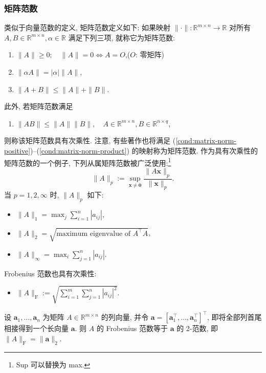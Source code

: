 \subsubsection{{矩阵范数}}\label{subsec:matrix-norm}
{类似于向量范数的定义, 矩阵范数定义如下: 如果映射 $\|\cdot\|:\mathbb R^{m\times n}\to\mathbb R$ 对所有 $A,B\in\mathbb R^{m\times n},\alpha\in\mathbb R$ 满足下列三项, 就称它为矩阵范数:}
\begin{enumerate}[label=(Nm\arabic*),ref=Nm\arabic*]
\item\label{cond:matrix-norm-positive} $\|A\|\ge0;\quad\|A\|=0\iff A=O$,\quad ($O$: {零矩阵})
\item\label{cond:matrix-norm-homogeneous} $\|\alpha A\|=|\alpha|\|A\|$,
\item\label{cond:matrix-norm-triangle} $\|A+B\|\le\|A\|+\|B\|$.
\end{enumerate}
{此外, 若矩阵范数满足}
\begin{enumerate}[label=(Nm\arabic*),ref=Nm\arabic*,start=4]
\item\label{cond:matrix-norm-product} $\|AB\|\le\|A\|\|B\|,\quad A\in\mathbb R^{m\times n},B\in\mathbb R^{n\times q}$,
\end{enumerate}
{则称该矩阵范数具有次乘性. 注意, 有些著作也将满足 (\ref{cond:matrix-norm-positive})--(\ref{cond:matrix-norm-product}) 的映射称为矩阵范数. 作为具有次乘性的矩阵范数的一个例子, 下列从属矩阵范数被广泛使用:\footnote{Sup 可以替换为 max.}}
\begin{equation}\label{eq:subordinate-matrix-norm}
\|A\|_p:=\sup_{\bm x\ne\bm0}\frac{\|A\bm x\|_p}{\|\bm x\|_p}.
\end{equation}
{\leavevmode{}\label{idx:chapter-01-section-01:matrix-norm-examples}当 $p=1,2,\infty$ 时, $\|A\|_p$ 如下:}
\begin{itemize}
\item $\|A\|_1=\max_j\sum_{i=1}^n|a_{ij}|$,
\item $\|A\|_2=\sqrt{\text{maximum eigenvalue of }A^\top A}$,
\item $\|A\|_\infty=\max_i\sum_{j=1}^n|a_{ij}|$.
\end{itemize}
{Frobenius 范数也具有次乘性:}
\begin{itemize}\item $\|A\|_{\mathrm F}:=\sqrt{\sum_{i=1}^m\sum_{j=1}^n|a_{ij}|^2}$.\end{itemize}
{设 $\bm a_1,\ldots,\bm a_n$ 为矩阵 $A\in\mathbb R^{m\times n}$ 的列向量, 并令 $\bm a=[\bm a_1^\top,\ldots,\bm a_n^\top]^\top$, 即将全部列首尾相接得到一个长向量 $\bm a$. 则 $A$ 的 Frobenius 范数等于 $\bm a$ 的 2-范数, 即 $\|A\|_{\mathrm F}=\|\bm a\|_2$.}
